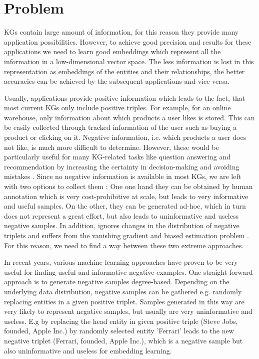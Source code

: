\chapter{Problem}
\label{ch:problem}

\acp{KG} contain large amount of information, for this reason they provide many application possibilities.
However, to achieve good precision and results for these applications we need to learn good embeddings which represent all the information in a low-dimensional vector space.
The less information is lost in this representation as embeddings of the entities and their relationships, the better accuracies can be achieved by the subsequent applications and vice versa.

Usually, applications provide positive information which leads to the fact, that most current \acp{KG} only include positive triples.
For example, for an online warehouse, only information about which products a user likes is stored.
This can be easily collected through tracked information of the user such as buying a product or clicking on it.
Negative information, i.e. which products a user does not like, is much more difficult to determine.
However, these would be particularly useful for many \ac{KG}-related tasks like question answering and recommendation by increasing the certainty in decision-making and avoiding mistakes \cite{safavi2021negater}.
Since no negative information is available in most \acp{KG}, we are left with two options to collect them \cite{safavi2021negater}: 
One one hand they can be obtained by human annotation which is very cost-prohibitive at scale, but leads to very informative and useful samples. 
On the other, they can be generated ad-hoc, which in turn does not represent a great effort, but also leads to uninformative and useless negative samples.
In addition, ignores changes in the distribution of negative triplets and
suffers from the vanishing gradient and biased estimation problem \cite{zhang2021efficient}.
For this reason, we need to find a way between these two extreme approaches.

In recent years, various machine learning approaches have proven to be very useful for finding useful and informative negative examples.
One straight forward approach is to generate negative samples degree-based.
Depending on the underlying data distribution, negative samples can be gathered e.g. randomly replacing entities in a given positive triplet.
Samples generated in this way are very likely to represent negative samples, but usually are very uninformative and useless.
E.g by replacing the head entity in given positive triple (Steve Jobs, founded, Apple Inc.) by randomly selected entity 'Ferrari' leads to the new negative triplet (Ferrari, founded, Apple Inc.), which is a negative sample but also uninformative and useless for embedding learning.

